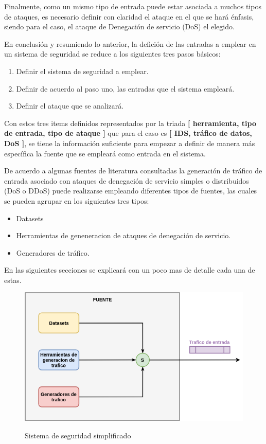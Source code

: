 \documentclass[12pt]{article}
\begin{document}
Finalmente, como un mismo tipo de entrada puede estar asociada a muchos tipos de ataques, es necesario definir con claridad el ataque en el que se hará énfasis, siendo para el caso, el ataque de Denegación de servicio (DoS) el elegido.

En conclusión y resumiendo lo anterior, la defición de las entradas a emplear en un sistema de seguridad se reduce a los siguientes tres pasos básicos:
\begin{enumerate}
\item Definir el sistema de seguridad a emplear.
\item Definir de acuerdo al paso uno, las entradas que el sistema empleará.
\item Definir el ataque que se analizará.
\end{enumerate}

Con estos tres items definidos representados por la triada \textbf{[ herramienta, tipo de entrada, tipo de ataque ]} que para el caso es \textbf{[ IDS, tráfico de datos, DoS ]}, se tiene la información suficiente para empezar a definir de manera más específica la fuente que se empleará como entrada en el sistema. 

De acuerdo a algunas fuentes de literatura consultadas \citep{dos_tools,net_attacks_taxonomy} la generación de tráfico de entrada asociado con ataques de denegación de servicio simples o distribuidos (DoS o DDoS) puede realizarse empleando diferentes tipos de fuentes, las cuales se pueden agrupar en los siguientes tres tipos:
 \begin{itemize}
\item Datasets
\item Herramientas de geneneracion de ataques de denegación de servicio.
\item Generadores de tráfico.
\end{itemize}

En las siguientes secciones se explicará con un poco mas de detalle cada una de estas.

\begin{figure}[htbp]
\begin{center}
\includegraphics[scale=0.5]{sources.png}\\[1cm] %
\caption{Sistema de seguridad simplificado}
\end{center}
\end{figure}
\end{document}

